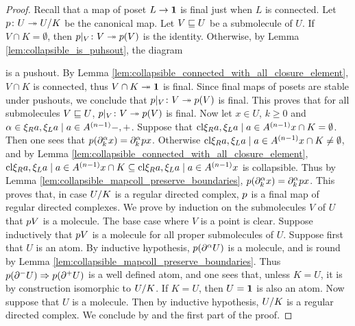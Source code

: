 \begin{proof}
    Recall that a map of poset \( L \to \pt \) is final just when \( L \) is connected. 
    Let \( \mapcoll \colon U \surj \coll{K}{U} \) be the canonical map.
    Let \( V \submol U \) be a submolecule of \( U \). 
    If \( V \cap K = \emptyset \), then \( \restr{\mapcoll}{V} \colon V \surj \mapcoll(V) \) is the identity.
    Otherwise, by Lemma \ref{lem:collapsible_is_puhsout}, the diagram
    \begin{center}
    \end{center}
    is a pushout.
    By Lemma \ref{lem:collapsible_connected_with_all_closure_element}, \( V \cap K \) is connected, thus \( V \cap K \surj \pt \) is final.
    Since final maps of posets are stable under pushouts, we conclude that \( \restr{\mapcoll}{V} \colon V \surj \mapcoll(V) \) is final.
    This proves that for all submolecules \( V \submol U \), \( \restr{\mapcoll}{V} \colon V \surj \mapcoll(V) \) is final.
    Now let \( x \in U \), \( k \geq 0 \) and \( \a \in \set{-, +} \).
    Suppose that \( \clset{x} \cap K = \emptyset \).
    Then one sees that \( \mapcoll(\bd{k}{\a} x) = \bd{k}{\a} \mapcoll x \).
    Otherwise \( \clset{x} \cap K \neq \emptyset \), and by Lemma \ref{lem:collapsible_connected_with_all_closure_element}, \( \clset{x} \cap K \subseteq \clset{x} \) is collapsible.
    Thus by Lemma \ref{lem:collapsible_mapcoll_preserve_boundaries}, \( \mapcoll(\bd{k}{\a} x) = \bd{k}{\a} \mapcoll x \).
    This proves that, in case \( \coll{K}{U} \) is a regular directed complex, \( \mapcoll \) is a final map of regular directed complexes.
    We prove by induction on the submolecules \( V \) of \( U \) that \( \mapcoll V \) is a molecule.
    The base case where \( V \) is a point is clear.
    Suppose inductively that \( \mapcoll V \) is a molecule for all proper submolecules of \( U \).
    Suppose first that \( U \) is an atom.
    By inductive hypothesis, \( p(\bd{}{\a} U) \) is a molecule, and is round by Lemma \ref{lem:collapsible_mapcoll_preserve_boundaries}.
    Thus \( p(\bd{}{-} U) \celto p(\bd{}{+} U) \) is a well defined atom, and one sees that, unless \( K = U \), it is by construction isomorphic to \( \coll{K}{U} \).
    If \( K = U \), then \( U = \pt \) is also an atom. 
    Now suppose that \( U \) is a molecule.
    Then by inductive hypothesis, \( \coll{K}{U} \) is a regular directed complex.
    We conclude by \cite[Proposition 6.2.33]{hadzihasanovic2024combinatorics} and the first part of the proof.
\end{proof}

